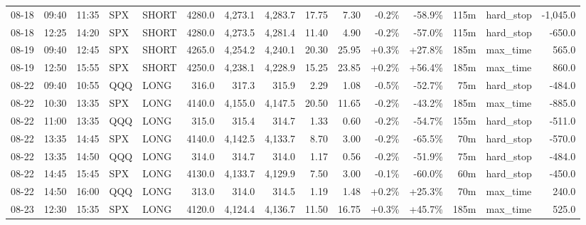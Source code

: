 \documentclass[11pt,a4paper,twoside]{article}
\begin{document}
\begin{landscape}
\begin{center}
\begin{longtable}{>{\color{txtmain}}l l l l l r r r r r r r r >{\color{txtmain}}l r}
08-18 & 09:40 & 11:35 & SPX & SHORT & 4280.0 & 4,273.1 & 4,283.7 & 17.75 & 7.30 & \textcolor{lossred}{-0.2\%} & \textcolor{lossred}{-58.9\%} & 115m & hard\_stop & \textcolor{lossred}{-1,045.0} \\
08-18 & 12:25 & 14:20 & SPX & SHORT & 4280.0 & 4,273.5 & 4,281.4 & 11.40 & 4.90 & \textcolor{lossred}{-0.2\%} & \textcolor{lossred}{-57.0\%} & 115m & hard\_stop & \textcolor{lossred}{-650.0} \\
08-19 & 09:40 & 12:45 & SPX & SHORT & 4265.0 & 4,254.2 & 4,240.1 & 20.30 & 25.95 & \textcolor{wingreen}{+0.3\%} & \textcolor{wingreen}{+27.8\%} & 185m & max\_time & \textcolor{wingreen}{565.0} \\
08-19 & 12:50 & 15:55 & SPX & SHORT & 4250.0 & 4,238.1 & 4,228.9 & 15.25 & 23.85 & \textcolor{wingreen}{+0.2\%} & \textcolor{wingreen}{+56.4\%} & 185m & max\_time & \textcolor{wingreen}{860.0} \\
08-22 & 09:40 & 10:55 & QQQ & LONG & 316.0 & 317.3 & 315.9 & 2.29 & 1.08 & \textcolor{lossred}{-0.5\%} & \textcolor{lossred}{-52.7\%} & 75m & hard\_stop & \textcolor{lossred}{-484.0} \\
08-22 & 10:30 & 13:35 & SPX & LONG & 4140.0 & 4,155.0 & 4,147.5 & 20.50 & 11.65 & \textcolor{lossred}{-0.2\%} & \textcolor{lossred}{-43.2\%} & 185m & max\_time & \textcolor{lossred}{-885.0} \\
08-22 & 11:00 & 13:35 & QQQ & LONG & 315.0 & 315.4 & 314.7 & 1.33 & 0.60 & \textcolor{lossred}{-0.2\%} & \textcolor{lossred}{-54.7\%} & 155m & hard\_stop & \textcolor{lossred}{-511.0} \\
08-22 & 13:35 & 14:45 & SPX & LONG & 4140.0 & 4,142.5 & 4,133.7 & 8.70 & 3.00 & \textcolor{lossred}{-0.2\%} & \textcolor{lossred}{-65.5\%} & 70m & hard\_stop & \textcolor{lossred}{-570.0} \\
08-22 & 13:35 & 14:50 & QQQ & LONG & 314.0 & 314.7 & 314.0 & 1.17 & 0.56 & \textcolor{lossred}{-0.2\%} & \textcolor{lossred}{-51.9\%} & 75m & hard\_stop & \textcolor{lossred}{-484.0} \\
08-22 & 14:45 & 15:45 & SPX & LONG & 4130.0 & 4,133.7 & 4,129.9 & 7.50 & 3.00 & \textcolor{lossred}{-0.1\%} & \textcolor{lossred}{-60.0\%} & 60m & hard\_stop & \textcolor{lossred}{-450.0} \\
08-22 & 14:50 & 16:00 & QQQ & LONG & 313.0 & 314.0 & 314.5 & 1.19 & 1.48 & \textcolor{wingreen}{+0.2\%} & \textcolor{wingreen}{+25.3\%} & 70m & max\_time & \textcolor{wingreen}{240.0} \\
08-23 & 12:30 & 15:35 & SPX & LONG & 4120.0 & 4,124.4 & 4,136.7 & 11.50 & 16.75 & \textcolor{wingreen}{+0.3\%} & \textcolor{wingreen}{+45.7\%} & 185m & max\_time & \textcolor{wingreen}{525.0} \\

\end{longtable}
\end{center}
\end{landscape}
\end{document}
